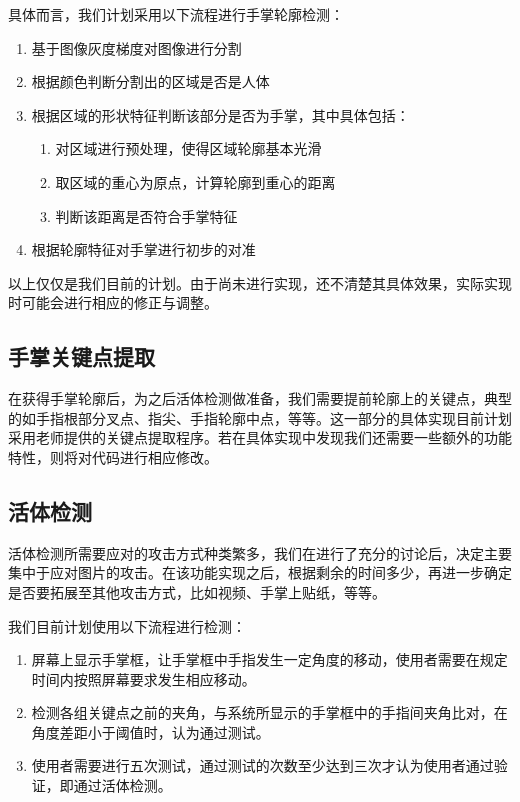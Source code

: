 \documentclass[UTF8]{ctexart}
\begin{document}
    具体而言，我们计划采用以下流程进行手掌轮廓检测：
		\begin{enumerate}
			\item 基于图像灰度梯度对图像进行分割
			\item 根据颜色判断分割出的区域是否是人体
			\item 根据区域的形状特征判断该部分是否为手掌，其中具体包括：
				\begin{enumerate}
				  \item 对区域进行预处理，使得区域轮廓基本光滑
				  \item 取区域的重心为原点，计算轮廓到重心的距离
				  \item 判断该距离是否符合手掌特征
				\end{enumerate}
			\item 根据轮廓特征对手掌进行初步的对准
		\end{enumerate}

    以上仅仅是我们目前的计划。由于尚未进行实现，还不清楚其具体效果，实际实现时可能会进行相应的修正与调整。

	\subsection{手掌关键点提取}
	
    在获得手掌轮廓后，为之后活体检测做准备，我们需要提前轮廓上的关键点，典型的如手指根部分叉点、指尖、手指轮廓中点，等等。这一部分的具体实现目前计划采用老师提供的关键点提取程序。若在具体实现中发现我们还需要一些额外的功能特性，则将对代码进行相应修改。

	\subsection{活体检测}

    活体检测所需要应对的攻击方式种类繁多，我们在进行了充分的讨论后，决定主要集中于应对图片的攻击。在该功能实现之后，根据剩余的时间多少，再进一步确定是否要拓展至其他攻击方式，比如视频、手掌上贴纸，等等。
    
    我们目前计划使用以下流程进行检测：
		
		\begin{enumerate}
			
			\item 屏幕上显示手掌框，让手掌框中手指发生一定角度的移动，使用者需要在规定时间内按照屏幕要求发生相应移动。
			
			\item 检测各组关键点之前的夹角，与系统所显示的手掌框中的手指间夹角比对，在角度差距小于阈值时，认为通过测试。
			
			\item 使用者需要进行五次测试，通过测试的次数至少达到三次才认为使用者通过验证，即通过活体检测。
			
		\end{enumerate}
		
\end{document}
